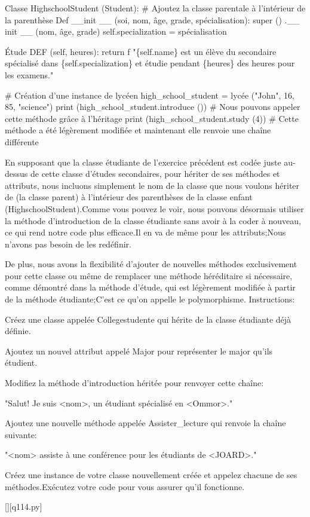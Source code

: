 Classe HighschoolStudent (Student): \# Ajoutez la classe parentale à l'intérieur de la parenthèse
Def \_\_init \_\_ (soi, nom, âge, grade, spécialisation):
super () .\_\_ init \_\_ (nom, âge, grade)
self.specialization = spécialisation

Étude DEF (self, heures):
return f "\{self.name\} est un élève du secondaire spécialisé dans \{self.specialization\} et étudie pendant \{heures\} des heures pour les examens."

\# Création d'une instance de lycéen
high\_school\_student = lycée ("John", 16, 85, "science")
print (high\_school\_student.introduce ()) \# Nous pouvons appeler cette méthode grâce à l'héritage
print (high\_school\_student.study (4)) \# Cette méthode a été légèrement modifiée et maintenant elle renvoie une chaîne différente

En supposant que la classe étudiante de l'exercice précédent est codée juste au-dessus de cette classe d'études secondaires, pour hériter de ses méthodes et attributs, nous incluons simplement le nom de la classe que nous voulons hériter de (la classe parent) à l'intérieur des parenthèses de la classe enfant (HighschoolStudent).Comme vous pouvez le voir, nous pouvons désormais utiliser la méthode d'introduction de la classe étudiante sans avoir à la coder à nouveau, ce qui rend notre code plus efficace.Il en va de même pour les attributs;Nous n'avons pas besoin de les redéfinir.

De plus, nous avons la flexibilité d'ajouter de nouvelles méthodes exclusivement pour cette classe ou même de remplacer une méthode héréditaire si nécessaire, comme démontré dans la méthode d'étude, qui est légèrement modifiée à partir de la méthode étudiante;C'est ce qu'on appelle le polymorphisme.
Instructions:

Créez une classe appelée Collegestudente qui hérite de la classe étudiante déjà définie.

Ajoutez un nouvel attribut appelé Major pour représenter le major qu'ils étudient.

Modifiez la méthode d'introduction héritée pour renvoyer cette chaîne:

"Salut! Je suis <nom>, un étudiant spécialisé en <Ommor>."

Ajoutez une nouvelle méthode appelée Assister\_lecture qui renvoie la chaîne suivante:

"<nom> assiste à une conférence pour les étudiants de <JOARD>."

Créez une instance de votre classe nouvellement créée et appelez chacune de ses méthodes.Exécutez votre code pour vous assurer qu'il fonctionne.
        \par
        \renewcommand{\nomfichier}{q114.py}
        \begin{solution}
            \pythonfile{\chemincode \nomfichier}[][\nomfichier]
        \end{solution}
        

